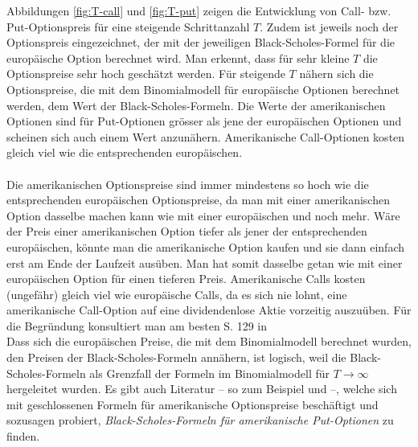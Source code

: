 \documentclass[11pt]{report} %
\begin{document}
Abbildungen \ref{fig:T-call} und \ref{fig:T-put} zeigen die Entwicklung von Call- bzw. Put-Optionspreis für eine steigende Schrittanzahl $T$. Zudem ist jeweils noch der Optionspreis eingezeichnet, der mit der jeweiligen Black-Scholes-Formel für die europäische Option berechnet wird. Man erkennt, dass für sehr kleine $T$ die Optionspreise sehr hoch geschätzt werden. Für steigende $T$ nähern sich die Optionspreise, die mit dem Binomialmodell für europäische Optionen berechnet werden, dem Wert der Black-Scholes-Formeln. Die Werte der amerikanischen Optionen sind für Put-Optionen grösser als jene der europäischen Optionen und scheinen sich auch einem Wert anzunähern. Amerikanische Call-Optionen kosten gleich viel wie die entsprechenden europäischen.\\\\
Die amerikanischen Optionspreise sind immer mindestens so hoch wie die entsprechenden europäischen Optionspreise, da man mit einer amerikanischen Option dasselbe machen kann wie mit einer europäischen und noch mehr. Wäre der Preis einer amerikanischen Option tiefer als jener der entsprechenden europäischen, könnte man die amerikanische Option kaufen und sie dann einfach erst am Ende der Laufzeit ausüben. Man hat somit dasselbe getan wie mit einer europäischen Option für einen tieferen Preis. Amerikanische Calls kosten (ungefähr) gleich viel wie europäische Calls, da es sich nie lohnt, eine amerikanische Call-Option auf eine dividendenlose Aktie vorzeitig auszuüben. Für die Begründung konsultiert man am besten S. 129 in \textcite{Adelmeyer2003}\\Dass sich die europäischen Preise, die mit dem Binomialmodell berechnet wurden, den Preisen der Black-Scholes-Formeln annähern, ist logisch, weil die Black-Scholes-Formeln als Grenzfall der Formeln im Binomialmodell für $T\rightarrow\infty$ hergeleitet wurden. Es gibt auch Literatur -- so zum Beispiel \textcite{Kim1990} und \textcite{Wang2016TheCS} --, welche sich mit geschlossenen Formeln für amerikanische Optionspreise beschäftigt und sozusagen probiert, \textit{Black-Scholes-Formeln für amerikanische Put-Optionen} zu finden.
\end{document}
